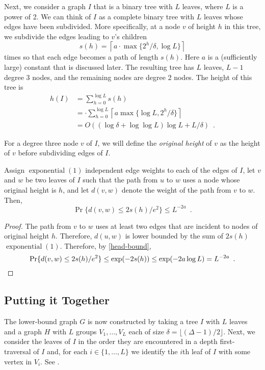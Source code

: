 \documentclass[lotsofwhite]{patmorin}
\DeclareMathOperator{\exponential}{exponential}
\begin{document}
Next, we consider a graph $I$ that is a binary tree with $L$ leaves,
where $L$ is a power of 2.  We can think of $I$ as a complete binary tree
with $L$ leaves whose edges have been subdivided.  More specifically,
at a node $v$ of height $h$ in this tree, we subdivide the edges leading
to $v$'s children
\[
   s(h) = \left\lceil a\cdot\max\{2^h/\delta,\log L\}\right\rceil 
\]
times so that each edge becomes a path of length $s(h)$.  Here $a$ is a
(sufficiently large) constant that is discussed later.  The resulting
tree has $L$ leaves, $L-1$ degree 3 nodes, and the remaining nodes are
degree 2 nodes.  The height of this tree is
\begin{align*}
   h(I) & = \sum_{h=0}^{\log L} s(h) \\
        & = \cdot\sum_{h=0}^{\log L} \left\lceil a\max\{\log L, 2^h/\delta\}\right\rceil \\
        & = O( (\log\delta+\log\log L)\log L + L/\delta ) \enspace .
\end{align*}

For a degree three node $v$ of $I$, we will define the \emph{original
height} of $v$ as the height of $v$ before subdividing edges of $I$.

\begin{lem}
   Assign $\exponential(1)$ independent edge weights to each of the edges
   of $I$, let $v$ and $w$ be two leaves of $I$ such that the path
   from $u$ to $w$ uses a node whose original height is $h$, and let $d(v,w)$
   denote the weight of the path from $v$ to $w$.  Then,
   \[  
        \Pr\{d(v,w) \le 2s(h)/e^2  \} \le L^{-2a} \enspace .
   \]
\end{lem}

\begin{proof}
   The path from $v$ to $w$ uses at least two edges that are incident to
   nodes of original height $h$.  Therefore, $d(u,w)$ is lower bounded
   by the sum of $2s(h)$ $\exponential(1)$. Therefore, by \eqref{head-bound},
   \[
      \Pr\{d(v,w) \le 2s(h)/e^2  \} 
       \le \exp(-2s(h)) \le \exp(-2a\log L) = L^{-2a} \enspace . \qedhere
   \]
\end{proof}

\subsection{Putting it Together}

The lower-bound graph $G$ is now constructed by taking a tree $I$ with
$L$ leaves and a graph $H$ with $L$ groups $V_1,\ldots,V_L$ each of
size $\delta=\lfloor(\Delta-1)/2\rfloor$.  Next, we consider the leaves of $I$ in the order they are encountered in a depth first-traversal of $I$ and, for each $i\in\{1,\ldots,L\}$ we identify the $i$th leaf of $I$ with some vertex in $V_i$.  See .
\end{document}
